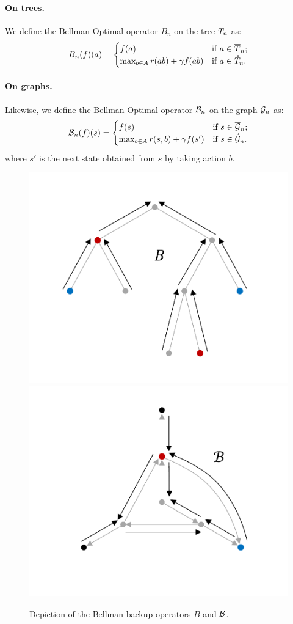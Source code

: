 \documentclass[runningheads]{llncs}
\begin{document}
\begin{definition}
	\paragraph{On trees.} We define the Bellman Optimal operator $B_n$ on the tree $T_n$ as:
	\begin{equation}
	\label{eq:bellman}
	B_n(f)(a) = \begin{cases}
	f(a) & \text{if $a\in\overline{T}_n$;} \\
	\max_{b\in A} r(ab) + \gamma f({ab})
	& \text{if $a\in\mathring{T}_n$.}
	\end{cases}
	\end{equation}
	
	\paragraph{On graphs.} Likewise, we define the Bellman Optimal operator $\mathcal{B}_n$ on the graph $\mathcal{G}_n$ as:
	\begin{equation}
	\label{eq:bellman}
	\mathcal{B}_n(f)(s) = \begin{cases}
	f(s) & \text{if $s\in\overline{\mathcal{G}}_n$;} \\
	\max_{b\in A} r(s, b) + \gamma f(s')
	& \text{if $s\in\mathring{\mathcal{G}}_n$.}
	\end{cases}
	\end{equation}
	where $s'$ is the next state obtained from $s$ by taking action $b$.
\end{definition}


\begin{figure}[H]
	\centering
	\includegraphics[trim={1.8cm 1.4cm 1.9cm 1.9cm}, clip,width=0.42\linewidth]{img/tree_2}
	\hfill
	\includegraphics[trim={1.8cm 1.4cm 1.9cm 1.9cm}, clip,width=0.46\linewidth]{img/graph_2}
	\caption{Depiction of the Bellman backup operators $B$ and $\mathcal{B}$.}
\end{figure}
\end{document}
